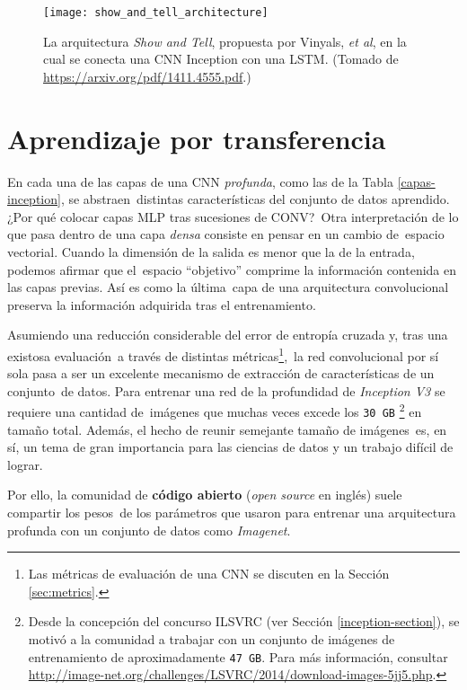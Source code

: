 \begin{figure}[H]
  \centering
  \texttt{[image: show\_and\_tell\_architecture]}
  \caption{La arquitectura \emph{Show and Tell}, propuesta por Vinyals, \emph{et al},\cite{DBLP:journals/corr/VinyalsTBE14}
    en la cual se conecta una CNN Inception con una LSTM.
    (Tomado de \url{https://arxiv.org/pdf/1411.4555.pdf}.)}
  \label{show_and_tell_architecture}
\end{figure}

\section{Aprendizaje por transferencia}

\noindent
En cada una de las capas de una CNN \emph{profunda}, como las de la Tabla \ref{capas-inception}, se abstraen\
distintas características del conjunto de datos aprendido. ¿Por qué colocar capas MLP tras sucesiones de CONV?\
Otra interpretación de lo que pasa dentro de una capa \emph{densa} consiste en pensar en un cambio de\
espacio vectorial. Cuando la dimensión de la salida es menor que la de la entrada, podemos afirmar que el\
espacio ``objetivo'' comprime la información contenida en las capas previas. Así es como la última\
capa de una arquitectura convolucional preserva la información adquirida tras el entrenamiento.\par
Asumiendo una reducción considerable del error de entropía cruzada y, tras una existosa evaluación\
a través de distintas métricas\footnote{
  Las métricas de evaluación de una CNN se discuten en la Sección \ref{sec:metrics}.
},\
la red convolucional por sí sola pasa a ser un excelente mecanismo de extracción de características de un conjunto\
de datos. Para entrenar una red de la profundidad de \emph{Inception V3} se requiere una cantidad de\
imágenes que muchas veces excede los \verb+30 GB+%
\footnote{
  Desde la concepción del concurso ILSVRC (ver Sección \ref{inception-section}), se motivó a la comunidad a trabajar
  con un conjunto de imágenes de entrenamiento de aproximadamente \texttt{47 GB}. Para más información, consultar
  \url{http://image-net.org/challenges/LSVRC/2014/download-images-5jj5.php}.
} en tamaño total. Además, el hecho de reunir semejante tamaño de imágenes\
es, en sí, un tema de gran importancia para las ciencias de datos y un trabajo difícil de lograr.\par
Por ello, la comunidad de \textbf{código abierto} (\emph{open source} en inglés) suele compartir los pesos\
de los parámetros que usaron para entrenar una arquitectura profunda con un conjunto de datos como \emph{Imagenet}.\
